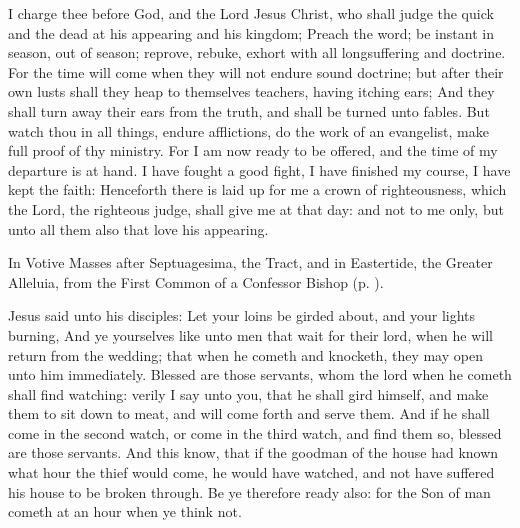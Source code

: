  I charge thee before God, and the Lord Jesus Christ, who shall judge the quick and the dead at his appearing and his kingdom; Preach the word; be instant in season, out of season; reprove, rebuke, exhort with all longsuffering and doctrine. For the time will come when they will not endure sound doctrine; but after their own lusts shall they heap to themselves teachers, having itching ears; And they shall turn away their ears from the truth, and shall be turned unto fables. But watch thou in all things, endure afflictions, do the work of an evangelist, make full proof of thy ministry. For I am now ready to be offered, and the time of my departure is at hand. I have fought a good fight, I have finished my course, I have kept the faith: Henceforth there is laid up for me a crown of righteousness, which the Lord, the righteous judge, shall give me at that day: and not to me only, but unto all them also that love his appearing.


\begin{rubric}
	In Votive Masses after Septuagesima, the Tract, and in Eastertide, the Greater Alleluia, from the First Common of a Confessor Bishop (p. \pageref{CommonConfessorBishopI}).
\end{rubric}

\vspace{-0.25\baselineskip}


\vspace{-0.1\baselineskip}

 Jesus said unto his disciples: Let your loins be girded about, and your lights burning, And ye yourselves like unto men that wait for their lord, when he will return from the wedding; that when he cometh and knocketh, they may open unto him immediately. Blessed are those servants, whom the lord when he cometh shall find watching: verily I say unto you, that he shall gird himself, and make them to sit down to meat, and will come forth and serve them. And if he shall come in the second watch, or come in the third watch, and find them so, blessed are those servants. And this know, that if the goodman of the house had known what hour the thief would come, he would have watched, and not have suffered his house to be broken through. Be ye therefore ready also: for the Son of man cometh at an hour when ye think not.

